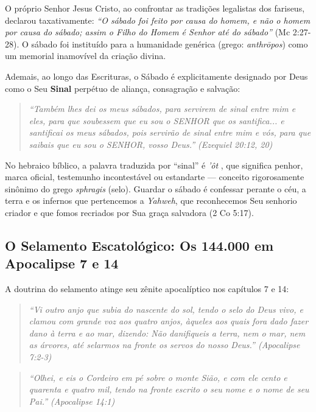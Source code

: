 \documentclass[11pt,a4paper,openany]{book}
\begin{document}
O próprio Senhor Jesus Cristo, ao confrontar as tradições legalistas dos fariseus, declarou taxativamente: \textit{``O sábado foi feito por causa do homem, e não o homem por causa do sábado; assim o Filho do Homem é Senhor até do sábado''} (Mc 2:27-28). O sábado foi instituído para a humanidade genérica (grego: \textit{anthrōpos}) como um memorial inamovível da criação divina.

Ademais, ao longo das Escrituras, o Sábado é explicitamente designado por Deus como o Seu \textbf{Sinal} perpétuo de aliança, consagração e salvação:


\begin{quote}
\itshape \textit{``Também lhes dei os meus sábados, para servirem de sinal entre mim e eles, para que soubessem que eu sou o SENHOR que os santifica... e santificai os meus sábados, pois servirão de sinal entre mim e vós, para que saibais que eu sou o SENHOR, vosso Deus.''} (Ezequiel 20:12, 20)
\end{quote}


No hebraico bíblico, a palavra traduzida por ``sinal'' é \textit{'ôt} , que significa penhor, marca oficial, testemunho incontestável ou estandarte — conceito rigorosamente sinônimo do grego \textit{sphragis} (selo). Guardar o sábado é confessar perante o céu, a terra e os infernos que pertencemos a \textit{Yahweh}, que reconhecemos Seu senhorio criador e que fomos recriados por Sua graça salvadora (2 Co 5:17).



\subsection{O Selamento Escatológico: Os 144.000 em Apocalipse 7 e 14}


A doutrina do selamento atinge seu zênite apocalíptico nos capítulos 7 e 14:


\begin{quote}
\itshape \textit{``Vi outro anjo que subia do nascente do sol, tendo o selo do Deus vivo, e clamou com grande voz aos quatro anjos, àqueles aos quais fora dado fazer dano à terra e ao mar, dizendo: Não danifiqueis a terra, nem o mar, nem as árvores, até selarmos na fronte os servos do nosso Deus.''} (Apocalipse 7:2-3)
\end{quote}



\begin{quote}
\itshape \textit{``Olhei, e eis o Cordeiro em pé sobre o monte Sião, e com ele cento e quarenta e quatro mil, tendo na fronte escrito o seu nome e o nome de seu Pai.''} (Apocalipse 14:1)
\end{quote}
\end{document}
